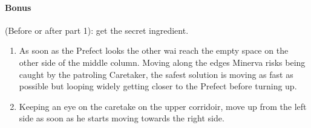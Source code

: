\paragraph{Bonus} (Before or after part 1): get the secret ingredient.

\begin{enumerate}[label={\arabic*.}]
	\item As soon as the Prefect looks the other wai reach the empty space on the other side of the middle column. Moving along the edges Minerva risks being caught by the patroling Caretaker, the safest solution is moving as fast as possible but looping widely getting closer to the Prefect before turning up.
	\item Keeping an eye on the caretake on the upper corridoir, move up from the left side as soon as he starts moving towards the right side.
\end{enumerate}

\pagebreak